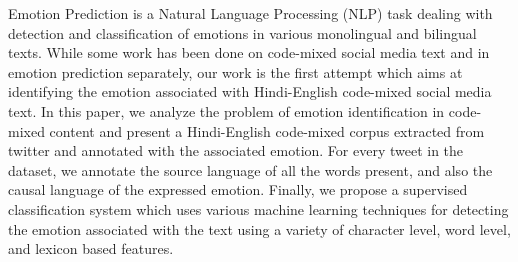 Emotion Prediction is a Natural Language Processing (NLP) task dealing with detection and classification of emotions in various monolingual and bilingual texts. While some work has been done on code-mixed social media text and in emotion prediction separately, our work is the first attempt which aims at identifying the emotion associated with Hindi-English code-mixed social media text. In this paper, we analyze the problem of emotion identification in code-mixed content and present a Hindi-English code-mixed corpus extracted from twitter and annotated with the associated emotion. For every tweet in the dataset, we annotate the source language of all the words present, and also the causal language of the expressed emotion. Finally, we propose a supervised classification system which uses various machine learning techniques for detecting the emotion associated with the text using a variety of character level, word level, and lexicon based features.
